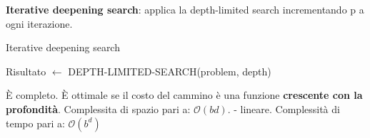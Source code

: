 \textbf{Iterative deepening search}: applica la depth-limited search incrementando
p a ogni iterazione.

\begin{algorithm}
    \caption{Iterative deepening search}
    \label{alg:search2}
    \begin{algorithmic}[1] %
         
            \State Risultato $\leftarrow$ DEPTH-LIMITED-SEARCH(problem, depth)
              \EndIf
			\EndFor
        \EndProcedure
    \end{algorithmic}
\end{algorithm}

È completo.
È ottimale se il costo del cammino è una funzione \textbf{crescente con
la profondità}.
Complessita di spazio pari a: $\mathcal{O}(bd).$ - lineare.
Complessità di tempo pari a: $\mathcal{O}(b^d)$\\
